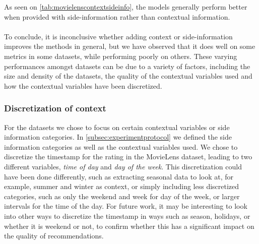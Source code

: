 As seen on \autoref{tab:movielenscontextsideinfo}, the models generally perform better when provided with side-information rather than contextual information.
\\\\
To conclude, it is inconclusive whether adding context or side-information improves the methods in general, but we have observed that it does well on some metrics in some datasets, while performing poorly on others.
These varying performances amongst datasets can be due to a variety of factors, including the size and density of the datasets, the quality of the contextual variables used and how the contextual variables have been discretized.\\

\subsubsection{Discretization of context}
For the datasets we chose to focus on certain contextual variables or side information categories.
In \autoref{subsec:experimentprotocol} we defined the side information categories as well as the contextual variables used.
We chose to discretize the timestamp for the rating in the MovieLens dataset, leading to two different variables, \textit{time of day} and \textit{day of the week}.
This discretization could have been done differently, such as extracting seasonal data to look at, for example, summer and winter as context, or simply including less discretized categories, such as only the weekend and week for day of the week, or larger intervals for the time of the day.
For future work, it may be interesting to look into other ways to discretize the timestamp in ways such as season, holidays, or whether it is weekend or not, to confirm whether this has a significant impact on the quality of recommendations.

